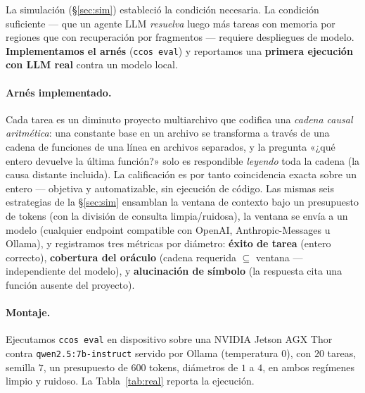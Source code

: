 \documentclass[11pt]{article}
\newcommand{\code}[1]{\texttt{#1}}
\begin{document}
La simulación (\S\ref{sec:sim}) estableció la condición necesaria. La condición
suficiente --- que un agente LLM \emph{resuelva} luego más tareas con memoria por
regiones que con recuperación por fragmentos --- requiere despliegues de modelo.
\textbf{Implementamos el arnés} (\code{ccos eval}) y reportamos una \textbf{primera
ejecución con LLM real} contra un modelo local.

\paragraph{Arnés implementado.} Cada tarea es un diminuto proyecto multiarchivo que
codifica una \emph{cadena causal aritmética}: una constante base en un archivo se
transforma a través de una cadena de funciones de una línea en archivos separados, y la
pregunta «¿qué entero devuelve la última función?» solo es respondible \emph{leyendo}
toda la cadena (la causa distante incluida). La calificación es por tanto coincidencia
exacta sobre un entero --- objetiva y automatizable, sin ejecución de código. Las mismas
seis estrategias de la \S\ref{sec:sim} ensamblan la ventana de contexto bajo un
presupuesto de tokens (con la división de consulta limpia/ruidosa), la ventana se envía
a un modelo (cualquier endpoint compatible con OpenAI, Anthropic-Messages u Ollama), y
registramos tres métricas por diámetro: \textbf{éxito de tarea} (entero correcto),
\textbf{cobertura del oráculo} (cadena requerida $\subseteq$ ventana --- independiente
del modelo), y \textbf{alucinación de símbolo} (la respuesta cita una función ausente
del proyecto).

\paragraph{Montaje.} Ejecutamos \code{ccos eval} en dispositivo sobre una NVIDIA Jetson
AGX Thor contra \code{qwen2.5:7b-instruct} servido por Ollama (temperatura $0$), con
$20$ tareas, semilla $7$, un presupuesto de $600$ tokens, diámetros de $1$ a $4$, en
ambos regímenes limpio y ruidoso. La Tabla~\ref{tab:real} reporta la ejecución.
\end{document}
